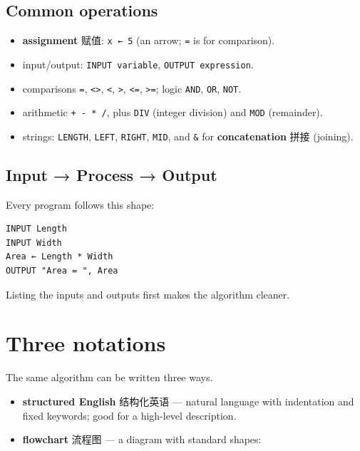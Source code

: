 \documentclass[11pt]{article}
\begin{document}
\subsection*{Common operations}

\begin{itemize}
\item \textbf{assignment} 赋值: \texttt{x ← 5} (an arrow; \texttt{=} is for comparison).

\item input/output: \texttt{INPUT variable}, \texttt{OUTPUT expression}.

\item comparisons \texttt{=}, \texttt{\textless{}\textgreater{}}, \texttt{\textless{}}, \texttt{\textgreater{}}, \texttt{\textless{}=}, \texttt{\textgreater{}=}; logic \texttt{AND}, \texttt{OR}, \texttt{NOT}.

\item arithmetic \texttt{+ - * /}, plus \texttt{DIV} (integer division) and \texttt{MOD} (remainder).

\item strings: \texttt{LENGTH}, \texttt{LEFT}, \texttt{RIGHT}, \texttt{MID}, and \texttt{\&} for \textbf{concatenation} 拼接 (joining).

\end{itemize}

\subsection*{Input → Process → Output}

Every program follows this shape:

\begin{Verbatim}
INPUT Length
INPUT Width
Area ← Length * Width
OUTPUT "Area = ", Area
\end{Verbatim}

Listing the inputs and outputs first makes the algorithm cleaner.

\section*{Three notations}

The same algorithm can be written three ways.

\begin{itemize}
\item \textbf{structured English} 结构化英语 — natural language with indentation and fixed keywords; good for a high-level description.

\item \textbf{flowchart} 流程图 — a diagram with standard shapes:

\end{itemize}
\end{document}
